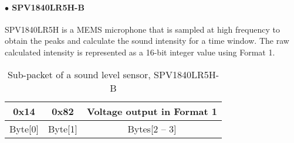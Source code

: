 \paragraph{$\bullet$ SPV1840LR5H-B}

SPV1840LR5H is a MEMS microphone that is sampled at high frequency to obtain
the peaks and calculate the sound intensity for a time window. The raw calculated
intensity is represented as a 16-bit integer value using Format 1.

\begin{table}[h!]
    \centering
    \caption{Sub-packet of a sound level sensor, SPV1840LR5H-B}
    \begin{tabular}{|c|c|c|}
        \hline
        \rowcolor{black!8}
        \textbf{0x14} & \textbf{0x82} & \textbf{Voltage output in Format 1}\\
        \hline
        Byte[0] & Byte[1] & Bytes[2 -- 3] \\ \hline
    \end{tabular}
\end{table}

